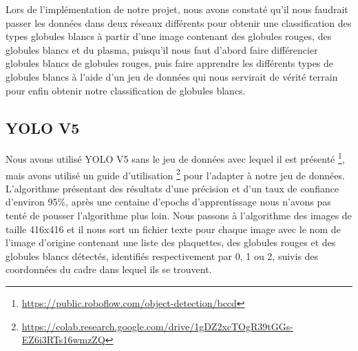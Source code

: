 \label{part2}
Lors de l'implémentation de notre projet, nous avons constaté qu'il nous faudrait passer les données dans deux réseaux différents pour obtenir une classification des types globules blancs à partir d'une image contenant des globules rouges, des globules blancs et du plasma, puisqu'il nous faut d'abord faire différencier globules blancs de globules rouges, puis faire apprendre les différents types de globules blancs à l'aide d'un jeu de données qui nous servirait de vérité terrain pour enfin obtenir notre classification de globules blancs.

\subsection{YOLO V5}
Nous avons utilisé YOLO V5 sans le jeu de données avec lequel il est présenté \footnote{\url{https://public.roboflow.com/object-detection/bccd}}, mais avons utilisé un guide d'utilisation \footnote{\url{https://colab.research.google.com/drive/1gDZ2xcTOgR39tGGs-EZ6i3RTs16wmzZQ}} pour l'adapter à notre jeu de données. L'algorithme présentant des résultats d'une précision et d'un taux de confiance d'environ 95\%, après une centaine d'epochs d'apprentissage nous n'avons pas tenté de pousser l'algorithme plus loin. Nous passons à l'algorithme des images de taille 416x416 et il nous sort un fichier texte pour chaque image avec le nom de l'image d'origine contenant une liste des plaquettes, des globules rouges et des globules blancs détectés, identifiés respectivement par 0, 1 ou 2, suivis des coordonnées du cadre dans lequel ils se trouvent.
